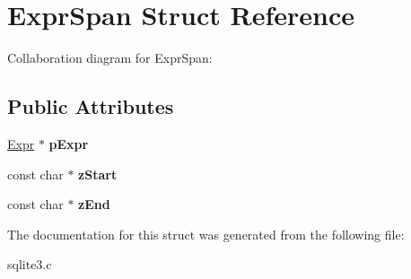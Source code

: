 \hypertarget{structExprSpan}{}\section{Expr\+Span Struct Reference}
\label{structExprSpan}


Collaboration diagram for Expr\+Span\+:
\subsection*{Public Attributes}
\begin{DoxyCompactItemize}
\item 
\hyperlink{structExpr}{Expr} $\ast$ {\bfseries p\+Expr}\hypertarget{structExprSpan_a081c4aa031331c8518c1173b2a8335cc}{}\label{structExprSpan_a081c4aa031331c8518c1173b2a8335cc}

\item 
const char $\ast$ {\bfseries z\+Start}\hypertarget{structExprSpan_af4653638d7e67a62e7a607f682b38e25}{}\label{structExprSpan_af4653638d7e67a62e7a607f682b38e25}

\item 
const char $\ast$ {\bfseries z\+End}\hypertarget{structExprSpan_a7cdf42cea729fcb5a1c477c3825ab575}{}\label{structExprSpan_a7cdf42cea729fcb5a1c477c3825ab575}

\end{DoxyCompactItemize}


The documentation for this struct was generated from the following file\+:\begin{DoxyCompactItemize}
\item 
sqlite3.\+c\end{DoxyCompactItemize}
